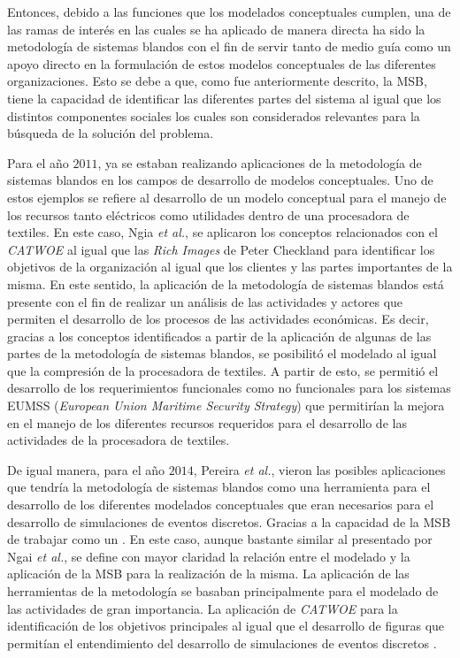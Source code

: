 \documentclass[10pt,letterpaper,twoside,twocolumn]{article}   %
\begin{document}
Entonces, debido a las funciones que los modelados conceptuales cumplen, una de las ramas de interés en las cuales se ha aplicado de manera directa ha sido la metodología de sistemas blandos con el fin de servir tanto de medio guía como un apoyo directo en la formulación de estos modelos conceptuales de las diferentes organizaciones. Esto se debe a que, como fue anteriormente descrito, la MSB, tiene la capacidad de identificar las diferentes partes del sistema al igual que los distintos componentes sociales los cuales son considerados relevantes para la búsqueda de la solución del problema. \cite{Checkland[2]}

Para el año $2011$, ya se estaban realizando aplicaciones de la metodología de sistemas blandos en los campos de desarrollo de modelos conceptuales. Uno de estos ejemplos se refiere al desarrollo de un modelo conceptual para el manejo de los recursos tanto eléctricos como utilidades dentro de una procesadora de textiles. En este caso, Ngia \textit{et al.}, se aplicaron los conceptos relacionados con el \textit{CATWOE} al igual que las \textit{Rich Images} de Peter Checkland para identificar los objetivos de la organización al igual que los clientes y las partes importantes de la misma. En este sentido, la aplicación de la metodología de sistemas blandos está presente con el fin de realizar un análisis de las actividades y actores que permiten el desarrollo de los procesos de las actividades económicas. Es decir, gracias a los conceptos identificados a partir de la aplicación de algunas de las partes de la metodología de sistemas blandos, se posibilitó el modelado al igual que la compresión de la procesadora de textiles. A partir de esto, se permitió el desarrollo de los requerimientos funcionales como no funcionales para los sistemas EUMSS (\textit{European Union Maritime Security Strategy}) que permitirían la mejora en el manejo de los diferentes recursos requeridos para el desarrollo de las actividades de la procesadora de textiles. \cite{Ngai[1]}

De igual manera, para el año $2014$, Pereira \textit{et al.}, vieron las posibles aplicaciones que tendría la metodología de sistemas blandos como una herramienta para el desarrollo de los diferentes modelados conceptuales que eran necesarios para el desarrollo de simulaciones de eventos discretos. Gracias a la capacidad de la MSB de trabajar como un  \cite{Pereira[1]}. En este caso, aunque bastante similar al presentado por Ngai \textit{et al.}, se define con mayor claridad la relación entre el modelado y la aplicación de la MSB para la realización de la misma. La aplicación de las herramientas de la metodología se basaban principalmente para el modelado de las actividades de gran importancia. La aplicación de \textit{CATWOE} para la identificación de los objetivos principales al igual que el desarrollo de figuras que permitían el entendimiento del desarrollo de simulaciones de eventos discretos \cite{Pereira[1]}.
\end{document}
